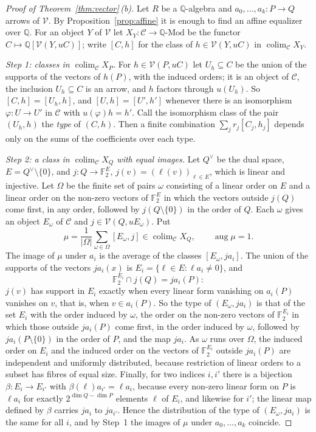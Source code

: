 \documentclass[11pt,a4paper]{article}
\theoremstyle{definition}
\newcommand{\C}{\mathcal{C}}
\newcommand{\V}{\mathcal{V}}
\newcommand{\Q}{\mathbb{Q}}
\newcommand{\F}{\mathbb{F}}
\newcommand{\colim}{\operatorname{colim}}
\newcommand{\aug}{\operatorname{aug}}
\begin{document}
\begin{proof}[Proof of Theorem~\ref{thm:vector}\,\textup{(b)}]
Let $R$ be a $\Q$-algebra and $a_0,\dots,a_k\colon P\to Q$ arrows of $\V$.
By Proposition~\ref{prop:affine} it is enough to find an affine equalizer
over $\Q$. For an object $Y$ of $\V$ let $X_Y\colon\C\to\Q\text{-Mod}$ be
the functor $C\mapsto\Q[\V(Y,uC)]$; write $[C,h]$ for the class of
$h\in\V(Y,uC)$ in $\colim_\C X_Y$.

\emph{Step 1: classes in $\colim_\C X_P$.} For $h\in\V(P,uC)$ let
$U_h\subseteq C$ be the union of the supports of the vectors of $h(P)$,
with the induced orders; it is an object of $\C$, the inclusion
$U_h\subseteq C$ is an arrow, and $h$ factors through $u(U_h)$. So
$[C,h]=[U_h,h]$, and $[U,h]=[U',h']$ whenever there is an isomorphism
$\varphi\colon U\to U'$ in $\C$ with $u(\varphi)h=h'$. Call the isomorphism
class of the pair $(U_h,h)$ the \emph{type} of $(C,h)$. Then a finite
combination $\sum_jr_j[C_j,h_j]$ depends only on the sums of the
coefficients over each type.

\emph{Step 2: a class in $\colim_\C X_Q$ with equal images.} Let $Q^\vee$
be the dual space, $E=Q^\vee\setminus\{0\}$, and
$j\colon Q\to\F_2^E$, $j(v)=(\ell(v))_{\ell\in E}$, which is linear and
injective. Let $\Omega$ be the finite set of pairs $\omega$ consisting of a
linear order on $E$ and a linear order on the non-zero vectors of $\F_2^E$
in which the vectors outside $j(Q)$ come first, in any order, followed by
$j(Q\setminus\{0\})$ in the order of $Q$. Each $\omega$ gives an object
$E_\omega$ of $\C$ and $j\in\V(Q,uE_\omega)$. Put
\[
 \mu=\frac1{|\Omega|}\sum_{\omega\in\Omega}[E_\omega,j]\in\colim_\C X_Q,
 \qquad\aug\mu=1 .
\]
The image of $\mu$ under $a_i$ is the average of the classes
$[E_\omega,ja_i]$. The union of the supports of the vectors $ja_i(x)$ is
$E_i=\{\ell\in E:\ell a_i\ne0\}$, and
\begin{equation}\label{eq:inter}
 \F_2^{E_i}\cap j(Q)=ja_i(P):
\end{equation}
$j(v)$ has support in $E_i$ exactly when every linear form vanishing on
$a_i(P)$ vanishes on $v$, that is, when $v\in a_i(P)$. So the type of
$(E_\omega,ja_i)$ is that of the set $E_i$ with the order induced by
$\omega$, the order on the non-zero vectors of $\F_2^{E_i}$ in which those
outside $ja_i(P)$ come first, in the order induced by $\omega$, followed by
$ja_i(P\setminus\{0\})$ in the order of $P$, and the map $ja_i$. As
$\omega$ runs over $\Omega$, the induced order on $E_i$ and the induced
order on the vectors of $\F_2^{E_i}$ outside $ja_i(P)$ are independent and
uniformly distributed, because restriction of linear orders to a subset
has fibres of equal size. Finally, for two indices $i,i'$ there is a
bijection $\beta\colon E_i\to E_{i'}$ with $\beta(\ell)a_{i'}=\ell a_i$,
because every non-zero linear form on $P$ is $\ell a_i$ for exactly
$2^{\dim Q-\dim P}$ elements $\ell$ of $E_i$, and likewise for $i'$; the
linear map defined by $\beta$ carries $ja_i$ to $ja_{i'}$. Hence the
distribution of the type of $(E_\omega,ja_i)$ is the same for all $i$, and
by Step~1 the images of $\mu$ under $a_0,\dots,a_k$ coincide.


\end{proof}
\end{document}

